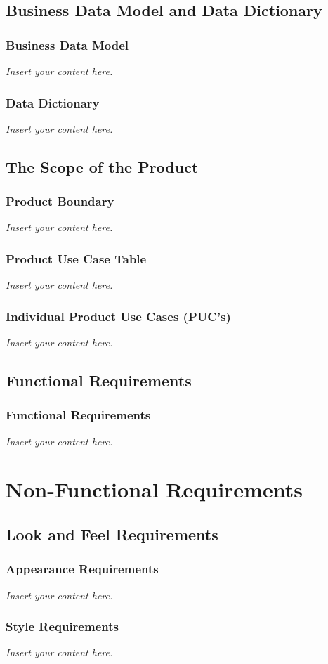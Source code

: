 \documentclass[12pt]{article}
\newcommand{\lips}{\textit{Insert your content here.}}
\begin{document}
\subsection{Business Data Model and Data Dictionary}
\subsubsection{Business Data Model}
\lips
\subsubsection{Data Dictionary}
\lips

\subsection{The Scope of the Product}
\subsubsection{Product Boundary}
\lips
\subsubsection{Product Use Case Table}
\lips
\subsubsection{Individual Product Use Cases (PUC's)}
\lips

\subsection{Functional Requirements}
\subsubsection{Functional Requirements}
\lips

\section{Non-Functional Requirements}
\subsection{Look and Feel Requirements}
\subsubsection{Appearance Requirements}
\lips
\subsubsection{Style Requirements}
\lips
\end{document}
